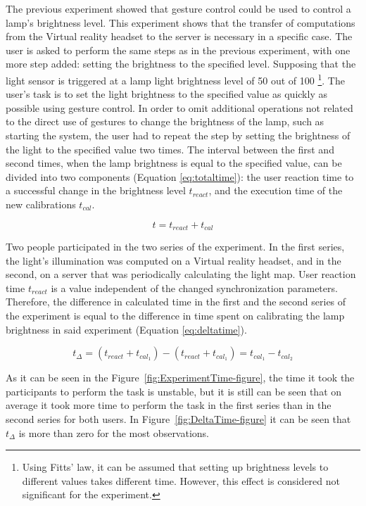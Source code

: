 The previous experiment showed that gesture control could be used to control a lamp's brightness level. This experiment shows that the transfer of computations from the Virtual reality headset to the server is necessary in a specific case. The user is asked to perform the same steps as in the previous experiment, with one more step added:  setting the brightness to the specified level. Supposing that the light sensor is triggered at a lamp light brightness level of 50 out of 100 \footnote{Using Fitts' law, it can be assumed that setting up brightness levels to different values takes different time. However, this effect is considered not significant for the experiment.}. The user's task is to set the light brightness to the specified value as quickly as possible using gesture control. In order to omit additional operations not related to the direct use of gestures to change the brightness of the lamp, such as starting the system, the user had to repeat the step by setting the brightness of the light to the specified value two times. The interval between the first and second times, when the lamp brightness is equal to the specified value, can be divided into two components (Equation \eqref{eq:totaltime}): the user reaction time to a successful change in the brightness level $ t_{react} $, and the execution time of the new calibrations $ t_{cal} $.


\begin{equation}
  t = t_{react} + t_{cal}
  \label{eq:totaltime}
\end{equation}

Two people participated in the two series of the experiment. In the first series, the light's illumination was computed on a Virtual reality headset, and in the second, on a server that was periodically calculating the light map. User reaction time $ t_{react} $ is a value independent of the changed synchronization parameters. Therefore, the difference in calculated time in the first and the second series of the experiment is equal to the difference in time spent on calibrating the lamp brightness in said experiment (Equation \eqref{eq:deltatime}).

\begin{equation}
  t _{\Delta} = (t_{react} + t_{cal_1}) - (t_{react} + t_{cal_1}) = t_{cal_1} - t_{cal_2}
  \label{eq:deltatime}
\end{equation}

As it can be seen in the Figure~\ref{fig:ExperimentTime-figure}, the time it took the participants to perform the task is unstable, but it is still can be seen that on average it took more time to perform the task in the first series than in the second series for both users. In Figure~\ref{fig:DeltaTime-figure} it can be seen that $t_{\Delta}$ is more than zero for the most observations.


